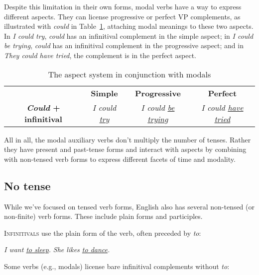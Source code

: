Despite this limitation in their own forms, modal verbs have a way to express different aspects. They can license progressive or perfect VP complements, as illustrated with \textit{could} in Table~\ref{tab:tense-modal}, attaching modal meanings to these two aspects. In \textit{I could try}, \textit{could} has an infinitival complement in the simple aspect; in \textit{I could be trying}, \textit{could} has an infinitival complement in the progressive aspect; and in \textit{They could have tried}, the complement is in the perfect aspect.

\begin{table}[ht]
    \centering
    \begin{tabular}{cccc}
       
        & \textbf{Simple} & \textbf{Progressive} & \textbf{Perfect} \\
        \textbf{\textit{Could} + infinitival} & 
        \textit{I could \uline{try}} & 
        \textit{I could \uline{be trying}} & 
        \textit{I could \uline{have tried}} \\
    \end{tabular}
    \caption{The aspect system in conjunction with modals}
    \label{tab:tense-modal}
\end{table}

All in all, the modal auxiliary verbs don't multiply the number of tenses. Rather they have present and past-tense forms and interact with aspects by combining with non-tensed verb forms to express different facets of time and modality.

\subsection{No tense}

While we've focused on tensed verb forms, English also has several non-tensed (or non-finite) verb forms. These include plain forms and participles.

\textsc{Infinitivals}\label{sec:infinitives} use the plain form of the verb, often preceded by \textit{to}:

\ea
\ea \textit{I want \uline{to sleep}.}
\ex \textit{She likes \uline{to dance}.}
\z\z

\noindent Some verbs (e.g., modals) license bare infinitival complements without \textit{to}:

